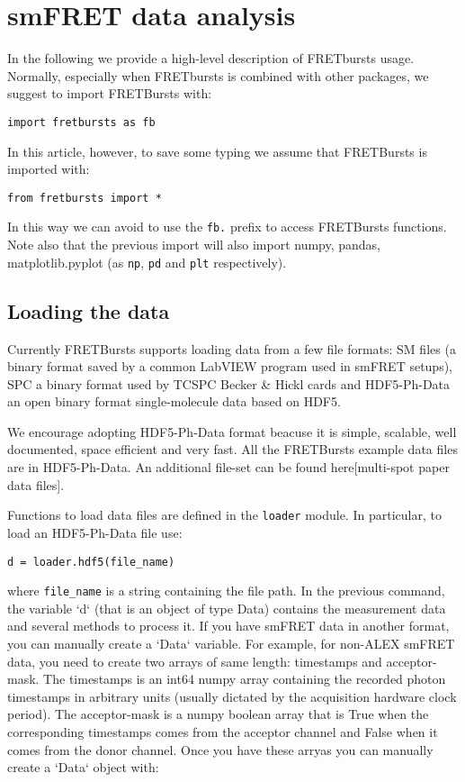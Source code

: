 \section{smFRET data analysis}

In the following we provide a high-level description of FRETbursts usage. Normally, especially when FRETbursts is combined with other packages, we suggest to import FRETBursts with:

\verb|import fretbursts as fb|

In this article, however, to save some typing we assume that FRETBursts is imported with:

\verb|from fretbursts import *|

In this way we can avoid to use the \verb|fb.| prefix to access FRETBursts functions. Note also that the previous import will also import numpy, pandas, matplotlib.pyplot (as \verb|np|, \verb|pd| and \verb|plt| respectively).

\subsection{Loading the data}
Currently FRETBursts supports loading data from a few file formats: SM files (a binary format saved by a common LabVIEW program used in smFRET setups), SPC a binary format used by TCSPC Becker & Hickl cards and HDF5-Ph-Data an open binary format single-molecule data based on HDF5.

We encourage adopting HDF5-Ph-Data format beacuse it is simple, scalable, well documented, space efficient and very fast. All the FRETBursts example data files are in HDF5-Ph-Data. An additional file-set can be found here[multi-spot paper data files].

Functions to load data files are defined in the \verb|loader| module. In particular, to load an HDF5-Ph-Data file use:

\verb|d = loader.hdf5(file_name)|

where \verb|file_name| is a string containing the file path. In the previous command, the variable `d` (that is an object of type Data) contains the measurement data and several methods to process it. 
If you have smFRET data in another format, you can manually create a `Data` variable. For example, for non-ALEX smFRET data, you need  to create two arrays of same length: timestamps and acceptor-mask. The timestamps is an int64 numpy array containing the recorded photon timestamps in arbitrary units (usually dictated by the acquisition hardware clock period). The acceptor-mask is a numpy boolean array that is True when the corresponding timestamps comes from the acceptor channel and False when it comes from the donor channel. Once you have these arryas you can manually create a `Data` object with:

